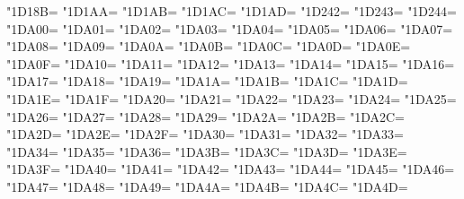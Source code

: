 \XeTeXcharclass"1D18B=\KclassCM
\XeTeXcharclass"1D1AA=\KclassCM
\XeTeXcharclass"1D1AB=\KclassCM
\XeTeXcharclass"1D1AC=\KclassCM
\XeTeXcharclass"1D1AD=\KclassCM
\XeTeXcharclass"1D242=\KclassCM
\XeTeXcharclass"1D243=\KclassCM
\XeTeXcharclass"1D244=\KclassCM
\XeTeXcharclass"1DA00=\KclassCM
\XeTeXcharclass"1DA01=\KclassCM
\XeTeXcharclass"1DA02=\KclassCM
\XeTeXcharclass"1DA03=\KclassCM
\XeTeXcharclass"1DA04=\KclassCM
\XeTeXcharclass"1DA05=\KclassCM
\XeTeXcharclass"1DA06=\KclassCM
\XeTeXcharclass"1DA07=\KclassCM
\XeTeXcharclass"1DA08=\KclassCM
\XeTeXcharclass"1DA09=\KclassCM
\XeTeXcharclass"1DA0A=\KclassCM
\XeTeXcharclass"1DA0B=\KclassCM
\XeTeXcharclass"1DA0C=\KclassCM
\XeTeXcharclass"1DA0D=\KclassCM
\XeTeXcharclass"1DA0E=\KclassCM
\XeTeXcharclass"1DA0F=\KclassCM
\XeTeXcharclass"1DA10=\KclassCM
\XeTeXcharclass"1DA11=\KclassCM
\XeTeXcharclass"1DA12=\KclassCM
\XeTeXcharclass"1DA13=\KclassCM
\XeTeXcharclass"1DA14=\KclassCM
\XeTeXcharclass"1DA15=\KclassCM
\XeTeXcharclass"1DA16=\KclassCM
\XeTeXcharclass"1DA17=\KclassCM
\XeTeXcharclass"1DA18=\KclassCM
\XeTeXcharclass"1DA19=\KclassCM
\XeTeXcharclass"1DA1A=\KclassCM
\XeTeXcharclass"1DA1B=\KclassCM
\XeTeXcharclass"1DA1C=\KclassCM
\XeTeXcharclass"1DA1D=\KclassCM
\XeTeXcharclass"1DA1E=\KclassCM
\XeTeXcharclass"1DA1F=\KclassCM
\XeTeXcharclass"1DA20=\KclassCM
\XeTeXcharclass"1DA21=\KclassCM
\XeTeXcharclass"1DA22=\KclassCM
\XeTeXcharclass"1DA23=\KclassCM
\XeTeXcharclass"1DA24=\KclassCM
\XeTeXcharclass"1DA25=\KclassCM
\XeTeXcharclass"1DA26=\KclassCM
\XeTeXcharclass"1DA27=\KclassCM
\XeTeXcharclass"1DA28=\KclassCM
\XeTeXcharclass"1DA29=\KclassCM
\XeTeXcharclass"1DA2A=\KclassCM
\XeTeXcharclass"1DA2B=\KclassCM
\XeTeXcharclass"1DA2C=\KclassCM
\XeTeXcharclass"1DA2D=\KclassCM
\XeTeXcharclass"1DA2E=\KclassCM
\XeTeXcharclass"1DA2F=\KclassCM
\XeTeXcharclass"1DA30=\KclassCM
\XeTeXcharclass"1DA31=\KclassCM
\XeTeXcharclass"1DA32=\KclassCM
\XeTeXcharclass"1DA33=\KclassCM
\XeTeXcharclass"1DA34=\KclassCM
\XeTeXcharclass"1DA35=\KclassCM
\XeTeXcharclass"1DA36=\KclassCM
\XeTeXcharclass"1DA3B=\KclassCM
\XeTeXcharclass"1DA3C=\KclassCM
\XeTeXcharclass"1DA3D=\KclassCM
\XeTeXcharclass"1DA3E=\KclassCM
\XeTeXcharclass"1DA3F=\KclassCM
\XeTeXcharclass"1DA40=\KclassCM
\XeTeXcharclass"1DA41=\KclassCM
\XeTeXcharclass"1DA42=\KclassCM
\XeTeXcharclass"1DA43=\KclassCM
\XeTeXcharclass"1DA44=\KclassCM
\XeTeXcharclass"1DA45=\KclassCM
\XeTeXcharclass"1DA46=\KclassCM
\XeTeXcharclass"1DA47=\KclassCM
\XeTeXcharclass"1DA48=\KclassCM
\XeTeXcharclass"1DA49=\KclassCM
\XeTeXcharclass"1DA4A=\KclassCM
\XeTeXcharclass"1DA4B=\KclassCM
\XeTeXcharclass"1DA4C=\KclassCM
\XeTeXcharclass"1DA4D=\KclassCM
